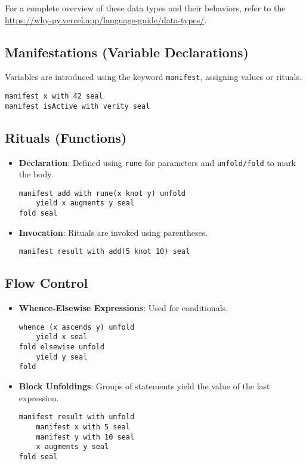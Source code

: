 \documentclass[conference]{IEEEtran}
\begin{document}
For a complete overview of these data types and their behaviors, refer to the \url{https://why-py.vercel.app/language-guide/data-types/}.



\subsection{Manifestations (Variable Declarations)}
Variables are introduced using the keyword \texttt{manifest}, assigning values or rituals.
\begin{lstlisting}
manifest x with 42 seal
manifest isActive with verity seal
\end{lstlisting}

\subsection{Rituals (Functions)}
\begin{itemize}
    \item \textbf{Declaration}: Defined using \texttt{rune} for parameters and \texttt{unfold/fold} to mark the body.
    \begin{lstlisting}
manifest add with rune(x knot y) unfold
    yield x augments y seal
fold seal
    \end{lstlisting}
    \item \textbf{Invocation}: Rituals are invoked using parentheses.
    \begin{lstlisting}
manifest result with add(5 knot 10) seal
    \end{lstlisting}
\end{itemize}

\subsection{Flow Control}
\begin{itemize}
    \item \textbf{Whence-Elsewise Expressions}: Used for conditionals.
    \begin{lstlisting}
whence (x ascends y) unfold
    yield x seal
fold elsewise unfold
    yield y seal
fold
    \end{lstlisting}
    \item \textbf{Block Unfoldings}: Groups of statements yield the value of the last expression.
    \begin{lstlisting}
manifest result with unfold
    manifest x with 5 seal
    manifest y with 10 seal
    x augments y seal
fold seal
    \end{lstlisting}
\end{itemize}
\end{document}
